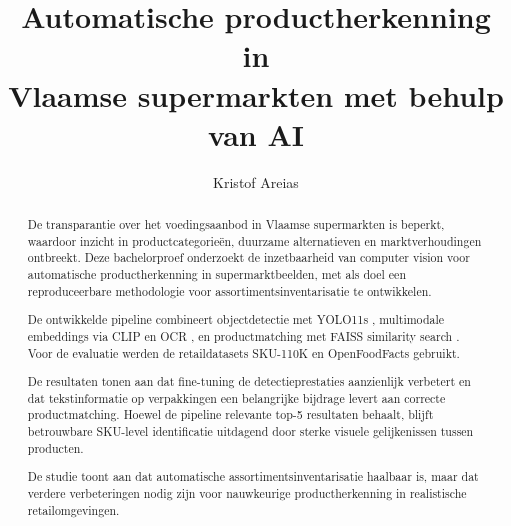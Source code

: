 \documentclass[a0,portrait]{hogent-poster}
\title{Automatische productherkenning in \\ Vlaamse supermarkten met behulp van AI}
\author{Kristof Areias}
\begin{document}
\maketitle

\vspace{-2.5em}
\begin{abstract}

De transparantie over het voedingsaanbod in Vlaamse supermarkten is beperkt, waardoor inzicht in productcategorieën, duurzame alternatieven en marktverhoudingen ontbreekt. Deze bachelorproef onderzoekt de inzetbaarheid van computer vision voor automatische productherkenning in supermarktbeelden, met als doel een reproduceerbare methodologie voor assortimentsinventarisatie te ontwikkelen.

De ontwikkelde pipeline combineert objectdetectie met YOLO11s \autocite{yolo11_ultralytics}, multimodale embeddings via CLIP \autocite{DBLP:journals/corr/abs-2103-00020} en OCR \autocite{xiao2023florence2advancingunifiedrepresentation}, en productmatching met FAISS similarity search \autocite{johnson2019billion}. Voor de evaluatie werden de retaildatasets SKU-110K \autocite{goldman2019dense} en OpenFoodFacts \autocite{openfoodfacts} gebruikt.

De resultaten tonen aan dat fine-tuning de detectieprestaties aanzienlijk verbetert en dat tekstinformatie op verpakkingen een belangrijke bijdrage levert aan correcte productmatching. Hoewel de pipeline relevante top-5 resultaten behaalt, blijft betrouwbare SKU-level identificatie uitdagend door sterke visuele gelijkenissen tussen producten.

De studie toont aan dat automatische assortimentsinventarisatie haalbaar is, maar dat verdere verbeteringen nodig zijn voor nauwkeurige productherkenning in realistische retailomgevingen.

\end{abstract}
\vspace{-1.5em}
\end{document}
